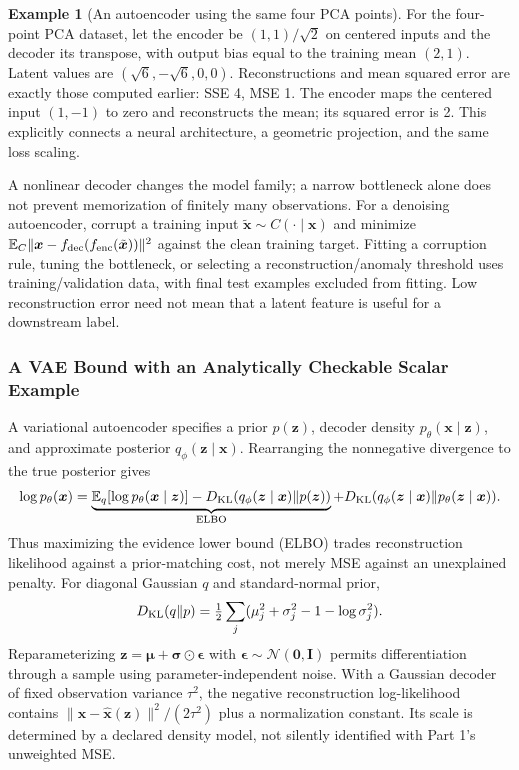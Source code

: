\documentclass[11pt,twoside]{article}
\numberwithin{equation}{section}
\newcommand{\E}{\mathbb{E}}
\newcommand{\vect}[1]{\bm{#1}}
\newcommand{\mat}[1]{\bm{#1}}
\theoremstyle{plain}
\theoremstyle{definition}
\newtheorem{example}[theorem]{Example}
\theoremstyle{remark}
\begin{document}
\begin{example}[An autoencoder using the same four PCA points]
For the four-point PCA dataset, let the encoder be $(1,1)/\sqrt2$ on centered inputs and the decoder its transpose, with output bias equal to the training mean $(2,1)$. Latent values are $(\sqrt6,-\sqrt6,0,0)$. Reconstructions and mean squared error are exactly those computed earlier: SSE 4, MSE 1. The encoder maps the centered input $(1,-1)$ to zero and reconstructs the mean; its squared error is 2. This explicitly connects a neural architecture, a geometric projection, and the same loss scaling.
\end{example}

A nonlinear decoder changes the model family; a narrow bottleneck alone does not prevent memorization of finitely many observations. For a denoising autoencoder, corrupt a training input $\tilde{\vect x}\sim C(\cdot\mid\vect x)$ and minimize $\E_C\|\vect x-f_{\rm dec}(f_{\rm enc}(\tilde{\vect x}))\|^2$ against the clean training target. Fitting a corruption rule, tuning the bottleneck, or selecting a reconstruction/anomaly threshold uses training/validation data, with final test examples excluded from fitting. Low reconstruction error need not mean that a latent feature is useful for a downstream label.

\subsubsection{A VAE Bound with an Analytically Checkable Scalar Example}
\label{sec:vae-bound}
A variational autoencoder specifies a prior $p(\vect z)$, decoder density $p_\theta(\vect x\mid\vect z)$, and approximate posterior $q_\phi(\vect z\mid\vect x)$. Rearranging the nonnegative divergence to the true posterior gives
\[
\log p_\theta(\vect x)
=\underbrace{\E_q[\log p_\theta(\vect x\mid\vect z)]-D_{\rm KL}(q_\phi(\vect z\mid\vect x)\|p(\vect z))}_{\mathrm{ELBO}}
+D_{\rm KL}(q_\phi(\vect z\mid\vect x)\|p_\theta(\vect z\mid\vect x)).
\]
Thus maximizing the evidence lower bound (ELBO) trades reconstruction likelihood against a prior-matching cost, not merely MSE against an unexplained penalty. For diagonal Gaussian $q$ and standard-normal prior,
\[
D_{\rm KL}(q\|p)=\tfrac12\sum_j(\mu_j^2+\sigma_j^2-1-\log\sigma_j^2).
\]
Reparameterizing $\vect z=\vect\mu+\vect\sigma\odot\vect\epsilon$ with $\vect\epsilon\sim\mathcal N(\vect0,\mat I)$ permits differentiation through a sample using parameter-independent noise. With a Gaussian decoder of fixed observation variance $\tau^2$, the negative reconstruction log-likelihood contains $\|\vect x-\hat{\vect x}(\vect z)\|^2/(2\tau^2)$ plus a normalization constant. Its scale is determined by a declared density model, not silently identified with Part 1's unweighted MSE.
\end{document}
